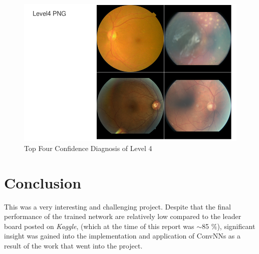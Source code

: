 \documentclass[letterpaper,12pt]{article}
\begin{document}
\begin{figure}[htbp]
\begin{center}
\includegraphics[scale=0.5]{images/Level4_Top4.png}
\caption{Top Four Confidence Diagnosis of Level 4}
\label{DR4}
\end{center}
\end{figure}

\newpage
\section{Conclusion}

This was a very interesting and challenging project. Despite that the final performance of the trained network are relatively low compared to the leader board posted on \textit{Kaggle}, (which at the time of this report was $\sim$85 $\%$), significant insight was gained into the implementation and application of ConvNNs as a result of the work that went into the project.

\newpage


\end{document}

